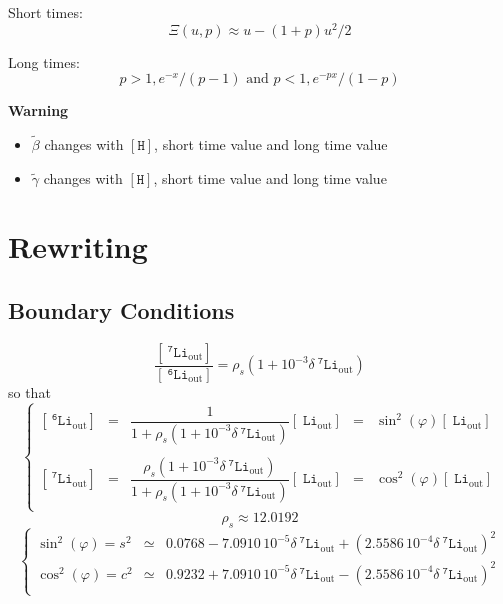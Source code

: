 \documentclass[aps,onecolumn,12pt]{revtex4}
\newcommand{\mychem}[1]{\mathtt{#1}}
\newcommand{\myconc}[1]{\left\lbrack{#1}\right\rbrack}
\newcommand{\spLi}[1]{{~^{\mychem{#1}}\mychem{Li}}}
\newcommand{\spLiOut}[1]{{\spLi{#1}}_{\mathrm{out}}}
\newcommand{\LiOut}[1]{\myconc{\spLiOut{#1}}}
\newcommand{\spproton}{\mychem{H}}
\newcommand{\proton}{\myconc{\spproton}}
\newcommand{\deltaLi}{ {\delta\!\!\!\spLi{7}} }
\newcommand{\deltaLiOut}{{\deltaLi}_{\mathrm{out}}}
\begin{document}
Short times: 
$$
	\Xi(u,p) \approx u - (1+p)u^2/2
$$

Long times:
$$
	p>1, e^{-x}/(p-1) \text{ and } p<1, e^{-px}/(1-p)
$$


\centerline{\bf Warning}
\begin{itemize}
	\item $\tilde\beta$ changes with $\proton$, short time value and long time value
	\item $\tilde\gamma$ changes with $\proton$, short time value and long time value
\end{itemize}

\section{Rewriting}

\subsection{Boundary Conditions}

\begin{equation}
	\dfrac{\LiOut{7}}{\LiOut{6}} = \rho_s \left(1+10^{-3}\deltaLiOut\right)
\end{equation}
so that
\begin{equation}
\left\lbrace
	\begin{array}{rclcl}
	\LiOut{6} & = & \dfrac{1}{1+\rho_s\left(1+10^{-3}\deltaLiOut\right)} \LiOut{} & = & \sin^2(\varphi) \LiOut{} \\
	\\
	\LiOut{7} & = & \dfrac{\rho_s\left(1+10^{-3}\deltaLiOut\right)}{1+\rho_s\left(1+10^{-3}\deltaLiOut\right)} \LiOut{} & = & \cos^2(\varphi)\LiOut{} \\
	\end{array}
\right.
\end{equation}
$$
	\rho_s \approx 12.0192
$$
\begin{equation}
\left\lbrace
	\begin{array}{rcl}
	\sin^2(\varphi) = s^2 & \simeq & 0.0768 - 7.0910\,10^{-5} \deltaLiOut + \left(2.5586\,10^{-4}\deltaLiOut\right)^2\\
	\cos^2(\varphi) = c^2 & \simeq & 0.9232 + 7.0910\,10^{-5} \deltaLiOut - \left(2.5586\,10^{-4}\deltaLiOut\right)^2\\
	\end{array}
\right.
\end{equation}
\end{document}
